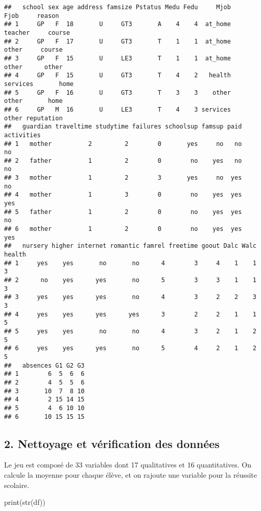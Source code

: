 \documentclass[
]{article}
\newenvironment{Shaded}{\begin{snugshade}}{\end{snugshade}}
\newcommand{\FunctionTok}[1]{\textcolor[rgb]{0.00,0.00,0.00}{#1}}
\newcommand{\NormalTok}[1]{#1}
\begin{document}
\begin{verbatim}
##   school sex age address famsize Pstatus Medu Fedu     Mjob     Fjob     reason
## 1     GP   F  18       U     GT3       A    4    4  at_home  teacher     course
## 2     GP   F  17       U     GT3       T    1    1  at_home    other     course
## 3     GP   F  15       U     LE3       T    1    1  at_home    other      other
## 4     GP   F  15       U     GT3       T    4    2   health services       home
## 5     GP   F  16       U     GT3       T    3    3    other    other       home
## 6     GP   M  16       U     LE3       T    4    3 services    other reputation
##   guardian traveltime studytime failures schoolsup famsup paid activities
## 1   mother          2         2        0       yes     no   no         no
## 2   father          1         2        0        no    yes   no         no
## 3   mother          1         2        3       yes     no  yes         no
## 4   mother          1         3        0        no    yes  yes        yes
## 5   father          1         2        0        no    yes  yes         no
## 6   mother          1         2        0        no    yes  yes        yes
##   nursery higher internet romantic famrel freetime goout Dalc Walc health
## 1     yes    yes       no       no      4        3     4    1    1      3
## 2      no    yes      yes       no      5        3     3    1    1      3
## 3     yes    yes      yes       no      4        3     2    2    3      3
## 4     yes    yes      yes      yes      3        2     2    1    1      5
## 5     yes    yes       no       no      4        3     2    1    2      5
## 6     yes    yes      yes       no      5        4     2    1    2      5
##   absences G1 G2 G3
## 1        6  5  6  6
## 2        4  5  5  6
## 3       10  7  8 10
## 4        2 15 14 15
## 5        4  6 10 10
## 6       10 15 15 15
\end{verbatim}

\hypertarget{nettoyage-et-vuxe9rification-des-donnuxe9es}{%
\subsection{2. Nettoyage et vérification des
données}\label{nettoyage-et-vuxe9rification-des-donnuxe9es}}

Le jeu est composé de 33 variables dont 17 qualitatives et 16
quantitatives. On calcule la moyenne pour chaque élève, et on rajoute
une variable pour la réussite scolaire.

\begin{Shaded}
\begin{Highlighting}[]
\FunctionTok{print}\NormalTok{(}\FunctionTok{str}\NormalTok{(df))}
\end{Highlighting}
\end{Shaded}
\end{document}

